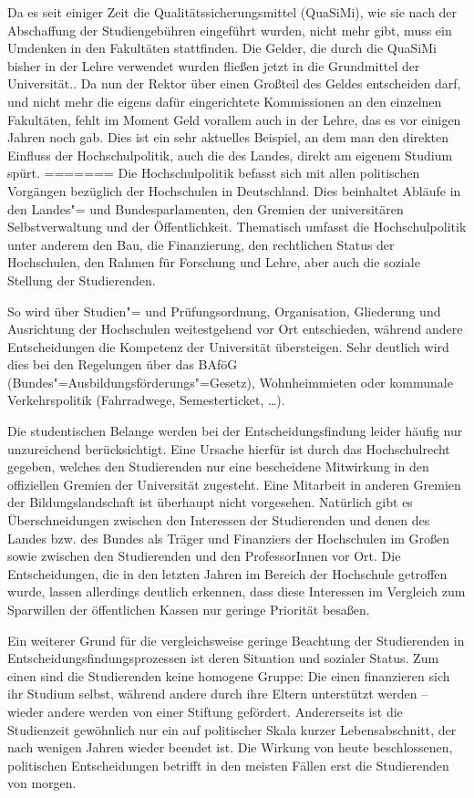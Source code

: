 Da es seit einiger Zeit die Qualitätssicherungsmittel (QuaSiMi), wie sie nach
der Abschaffung der Studiengebühren eingeführt wurden, nicht mehr gibt, muss
ein Umdenken in den Fakultäten stattfinden. Die Gelder, die durch die QuaSiMi
bisher in der Lehre verwendet wurden fließen jetzt in die Grundmittel der
Universität.. Da nun der Rektor über einen Großteil des Geldes entscheiden
darf, und nicht mehr die eigens dafür eingerichtete Kommissionen an den
einzelnen Fakultäten, fehlt im Moment Geld vorallem auch in der Lehre, das es
vor einigen Jahren noch gab.  Dies ist ein sehr aktuelles Beispiel, an dem man
den direkten Einfluss der Hochschulpolitik, auch die des Landes, direkt am
eigenem Studium spürt.
=======
Die Hochschulpolitik befasst sich mit allen politischen Vorgängen
bezüglich der Hochschulen in Deutschland. Dies beinhaltet Abläufe in den
Landes"= und Bundesparlamenten, den Gremien der universitären
Selbstverwaltung und der Öffentlichkeit. Thematisch umfasst die
Hochschulpolitik unter anderem den Bau, die Finanzierung, den rechtlichen
Status der Hochschulen, den Rahmen für Forschung und Lehre, aber auch die
soziale Stellung der Studierenden.

So wird über Studien"= und Prüfungsordnung, Organisation, Gliederung und
Ausrichtung der Hochschulen weitestgehend vor Ort entschieden, während
andere Entscheidungen die Kompetenz der Universität übersteigen. Sehr
deutlich wird dies bei den Regelungen über das BAföG
(Bundes"=Ausbildungsförderungs"=Gesetz), Wohnheimmieten oder kommunale
Verkehrspolitik (Fahrradwege, Semesterticket, \dots).

Die studentischen Belange werden bei der Entscheidungsfindung leider
häufig nur unzureichend berücksichtigt. Eine Ursache hierfür ist durch das
Hochschulrecht gegeben, welches den Studierenden nur eine bescheidene
Mitwirkung in den offiziellen Gremien der Universität zugesteht. Eine
Mitarbeit in anderen Gremien der Bildungslandschaft ist überhaupt nicht
vorgesehen. Natürlich gibt es Überschneidungen zwischen den Interessen der
Studierenden und denen des Landes bzw. des Bundes als Träger und
Finanziers der Hochschulen im Großen sowie zwischen den Studierenden und
den ProfessorInnen vor Ort. Die Entscheidungen, die in den letzten Jahren im
Bereich der Hochschule getroffen wurde, lassen allerdings deutlich
erkennen, dass diese Interessen im Vergleich zum Sparwillen der
öffentlichen Kassen nur geringe Priorität besaßen.

Ein weiterer Grund für die vergleichsweise geringe Beachtung der
Studierenden in Entscheidungsfindungsprozessen ist deren Situation und
sozialer Status. Zum einen sind die Studierenden keine homogene Gruppe:
Die einen finanzieren sich ihr Studium selbst, während andere durch ihre
Eltern unterstützt werden -- wieder andere werden von
einer Stiftung gefördert. Andererseits ist die Studienzeit gewöhnlich nur
ein auf politischer Skala kurzer Lebensabschnitt, der nach wenigen Jahren
wieder beendet ist. Die Wirkung von heute beschlossenen, politischen
Entscheidungen betrifft in den meisten Fällen erst die Studierenden von
morgen.

